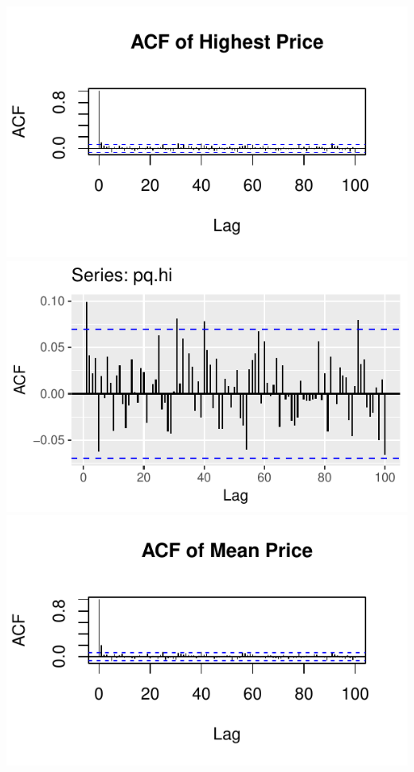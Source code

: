 \documentclass[]{tufte-book}
\begin{document}
\includegraphics{binary-forex-trading-Q1_files/figure-latex/acf-pacf-13}
\includegraphics{binary-forex-trading-Q1_files/figure-latex/acf-pacf-14}
\includegraphics{binary-forex-trading-Q1_files/figure-latex/acf-pacf-15}
\end{document}
